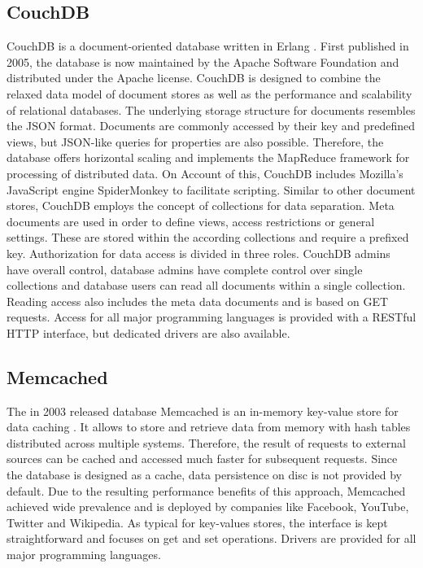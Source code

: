 \subsection{CouchDB}
CouchDB is a document-oriented database written in Erlang \cite{Anderson:2010}. First published in 2005, the database is now maintained by the Apache Software Foundation and distributed under the Apache license. CouchDB is designed to combine the relaxed data model of document stores as well as the performance and scalability of relational databases. The underlying storage structure for documents resembles the JSON format. Documents are commonly accessed by their key and predefined views, but JSON-like queries for properties are also possible. Therefore, the database offers horizontal scaling and implements the MapReduce framework for processing of distributed data. On Account of this, CouchDB includes Mozilla's JavaScript engine SpiderMonkey to facilitate scripting. Similar to other document stores, CouchDB employs the concept of collections for data separation. Meta documents are used in order to define views, access restrictions or general settings. These are stored within the according collections and require a prefixed key. Authorization for data access is divided in three roles. CouchDB admins have overall control, database admins have complete control over single collections and database users can read all documents within a single collection. Reading access also includes the meta data documents and is based on GET requests. Access for all major programming languages is provided with a RESTful HTTP interface, but dedicated drivers are also available.

\subsection{Memcached}
The in 2003 released database Memcached is an in-memory key-value store for data caching \cite{Dormando:2015}. It allows to store and retrieve data from memory with hash tables distributed across multiple systems. Therefore, the result of requests to external sources can be cached and accessed much faster for subsequent requests. Since the database is designed as a cache, data persistence on disc is not provided by default. Due to the resulting performance benefits of this approach, Memcached achieved wide prevalence and is deployed by companies like Facebook, YouTube, Twitter and Wikipedia. As typical for key-values stores, the interface is kept straightforward and focuses on get and set operations. Drivers are provided for all major programming languages.

